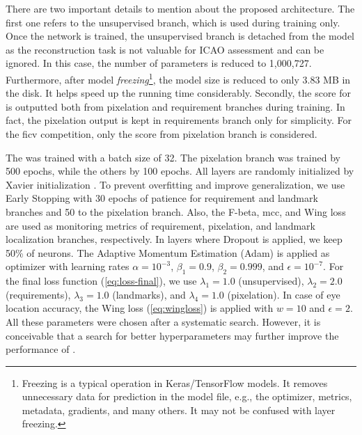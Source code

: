 There are two important details to mention about the proposed architecture. The first one refers to the unsupervised branch, which is used during training only. Once the network is trained, the unsupervised branch is detached from the model as the reconstruction task is not valuable for ICAO assessment and can be ignored. In this case, the number of parameters is reduced to 1,000,727. Furthermore, after model \textit{freezing}\footnote{Freezing is a typical operation in Keras/TensorFlow models. It removes unnecessary data for prediction in the model file, e.g., the optimizer, metrics, metadata, gradients, and many others. It may not be confused with layer freezing.}, the model size is reduced to only 3.83 MB in the disk. It helps speed up the running time considerably. Secondly, the score for \pixelation is outputted both from pixelation and requirement branches during training. In fact, the pixelation output is kept in requirements branch only for simplicity. For the \acs{ficv} competition, only the score from pixelation branch is considered.

The \methodname was trained with a batch size of 32. The pixelation branch was trained by 500 epochs, while the others by 100 epochs. All layers are randomly initialized by Xavier initialization \citep{glorot2010understanding}. To prevent overfitting and improve generalization, we use Early Stopping with 30 epochs of patience for requirement and landmark branches and 50 to the pixelation branch. Also, the F-beta, \acs{mcc}, and Wing loss are used as monitoring metrics of requirement, pixelation, and landmark localization branches, respectively. In layers where Dropout is applied, we keep 50\% of neurons. The Adaptive Momentum Estimation (Adam) is applied as optimizer with learning rates $\alpha=10^{-3}$, $\beta_1=0.9$, $\beta_2=0.999$, and $\epsilon=10^{-7}$. For the final loss function (\autoref{eq:loss-final}), we use $\lambda_1=1.0$ (unsupervised), $\lambda_2=2.0$ (requirements), $\lambda_3=1.0$ (landmarks), and $\lambda_4=1.0$ (pixelation). In case of eye location accuracy, the Wing loss (\autoref{eq:wingloss}) is applied with $w = 10$ and $\epsilon = 2$. All these parameters were chosen after a systematic search. However, it is conceivable that a search for better hyperparameters may further improve the performance of \methodname.


